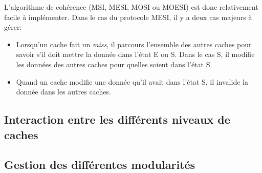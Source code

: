 L'algorithme de cohérence (MSI, MESI, MOSI ou MOESI) est donc relativement facile à implémenter. Dans le cas du protocole MESI, il y a deux cas majeurs à gérer: \\
\begin{itemize}
\item Lorsqu'un cache fait un \textit{miss}, il parcours l'ensemble des autres caches pour savoir s'il doit mettre la donnée dans l'état E ou S. Dans le cas S, il modifie les données des autres caches pour quelles soient dans l'état S.
\item Quand un cache modifie une donnée qu'il avait dans l'état S, il invalide la donnée dans les autres caches.
\end{itemize}

\subsection{Interaction entre les différents niveaux de caches}

\subsection{Gestion des différentes modularités}


